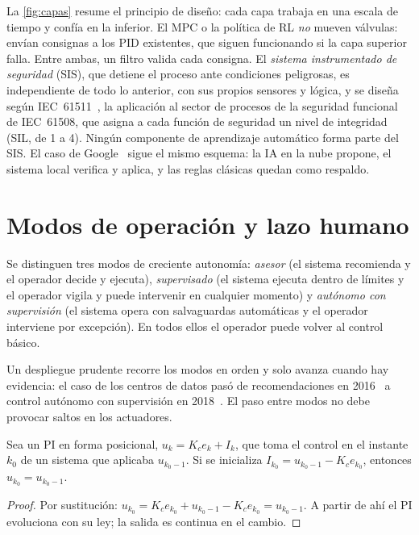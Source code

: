 La \cref{fig:capas} resume el principio de diseño: cada capa trabaja en una escala de tiempo y confía en la inferior. El MPC o la política de RL \emph{no} mueven válvulas: envían consignas a los PID existentes, que siguen funcionando si la capa superior falla. Entre ambas, un filtro valida cada consigna. El \emph{sistema instrumentado de seguridad} (SIS), que detiene el proceso ante condiciones peligrosas, es independiente de todo lo anterior, con sus propios sensores y lógica, y se diseña según IEC~61511~\cite{iec61511}, la aplicación al sector de procesos de la seguridad funcional de IEC~61508, que asigna a cada función de seguridad un nivel de integridad (SIL, de 1 a 4). Ningún componente de aprendizaje automático forma parte del SIS. El caso de Google~\cite{gamblegao} sigue el mismo esquema: la IA en la nube propone, el sistema local verifica y aplica, y las reglas clásicas quedan como respaldo.

\section{Modos de operación y lazo humano}

\begin{definicion}\label{def:modos}
Se distinguen tres modos de creciente autonomía: \emph{asesor} (el sistema recomienda y el operador decide y ejecuta), \emph{supervisado} (el sistema ejecuta dentro de límites y el operador vigila y puede intervenir en cualquier momento) y \emph{autónomo con supervisión} (el sistema opera con salvaguardas automáticas y el operador interviene por excepción). En todos ellos el operador puede volver al control básico.
\end{definicion}

Un despliegue prudente recorre los modos en orden y solo avanza cuando hay evidencia: el caso de los centros de datos pasó de recomendaciones en 2016~\cite{evansgao} a control autónomo con supervisión en 2018~\cite{gamblegao}. El paso entre modos no debe provocar saltos en los actuadores.

\begin{proposicion}\label{prop:bumpless}
Sea un PI en forma posicional, $u_k=K_ce_k+I_k$, que toma el control en el instante $k_0$ de un sistema que aplicaba $u_{k_0-1}$. Si se inicializa $I_{k_0}=u_{k_0-1}-K_ce_{k_0}$, entonces $u_{k_0}=u_{k_0-1}$.
\end{proposicion}

\begin{proof}
Por sustitución: $u_{k_0}=K_ce_{k_0}+u_{k_0-1}-K_ce_{k_0}=u_{k_0-1}$. A partir de ahí el PI evoluciona con su ley; la salida es continua en el cambio.
\end{proof}

